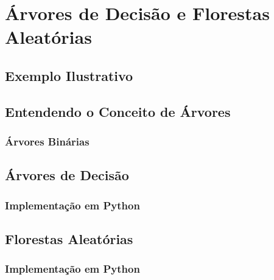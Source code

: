 
\chapter{Árvores de Decisão e Florestas Aleatórias}
\label{cap:arvores}

\section{Exemplo Ilustrativo}

\section{Entendendo o Conceito de Árvores}

\subsection{Árvores Binárias}

\section{Árvores de Decisão}

\subsection{Implementação em Python}

\section{Florestas Aleatórias}

\subsection{Implementação em Python}